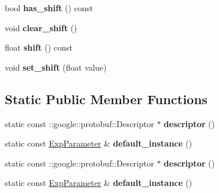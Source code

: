 \begin{DoxyCompactItemize}
bool {\bfseries has\+\_\+shift} () const
\item 
\mbox{\label{classcaffe_1_1_exp_parameter_a6b8827b941b95a703ade4a82088bb76d}} 
void {\bfseries clear\+\_\+shift} ()
\item 
\mbox{\label{classcaffe_1_1_exp_parameter_a43b60fada9ee5506b78270cbf459f5ac}} 
float {\bfseries shift} () const
\item 
\mbox{\label{classcaffe_1_1_exp_parameter_a21fbcb6ca095b0e4af2f36449ce2ad60}} 
void {\bfseries set\+\_\+shift} (float value)
\end{DoxyCompactItemize}
\subsection*{Static Public Member Functions}
\begin{DoxyCompactItemize}
\item 
\mbox{\label{classcaffe_1_1_exp_parameter_afc0c5578445e1aefa69caebdefd9b44d}} 
static const \+::google\+::protobuf\+::\+Descriptor $\ast$ {\bfseries descriptor} ()
\item 
\mbox{\label{classcaffe_1_1_exp_parameter_aa3ba74401eb7fe78a43e84d91194aac4}} 
static const \mbox{\hyperlink{classcaffe_1_1_exp_parameter}{Exp\+Parameter}} \& {\bfseries default\+\_\+instance} ()
\item 
\mbox{\label{classcaffe_1_1_exp_parameter_a90bba5ca444d0aef64e1622e70d12251}} 
static const \+::google\+::protobuf\+::\+Descriptor $\ast$ {\bfseries descriptor} ()
\item 
\mbox{\label{classcaffe_1_1_exp_parameter_a83549c512a0515f0450891d5e85b7371}} 
static const \mbox{\hyperlink{classcaffe_1_1_exp_parameter}{Exp\+Parameter}} \& {\bfseries default\+\_\+instance} ()
\end{DoxyCompactItemize}
